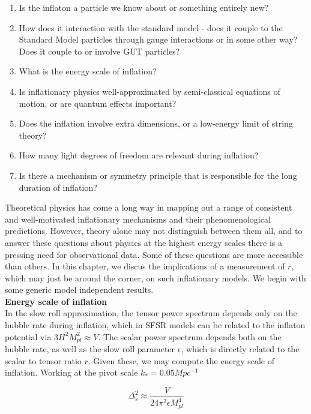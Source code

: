 \documentclass[a4paper,10pt]{article}
\newcommand{\Mp}{M_{pl}}
\begin{document}
\begin{enumerate}
\item Is the inflaton a particle we know about or something entirely new? 
\item How does it interaction with the standard model - does it couple to the Standard Model particles through gauge interactions or in some other way? Does it couple to or involve GUT particles?
\item What is the energy scale of inflation?
\item Is inflationary physics well-approximated by semi-classical equations of motion, or are quantum effects important? 
\item Does the inflation involve extra dimensions, or a low-energy limit of string theory? 
\item How many light degrees of freedom are relevant during inflation? 
\item Is there a mechanism or symmetry principle that is responsible for the long duration of inflation?
\end{enumerate}

Theoretical physics has come a long way in mapping out a range of consistent and well-motivated inflationary mechanisms and their phenomenological predictions. However, theory alone may not distinguish between them all, and to answer these questions about physics at the highest energy scales there is a pressing need for observational data. Some of these questions are more accessible than others. In this chapter, we discus the implications of a measurement of $r$, which may just be around the corner, on such inflationary models. We begin with some generic model independent results.\\

\textbf{Energy scale of inflation} \\

In the slow roll approximation, the tensor power spectrum depends only on the hubble rate during inflation, which in SFSR models can be related to the inflaton potential via $3H^2\Mp^2\approx V$. The scalar power spectrum depends both on the hubble rate, as well as the slow roll parameter $\epsilon$, which is directly related to the scalar to tensor ratio $r$. Given these, we may compute the energy scale of inflation. Working at the pivot scale $k_* = 0.05Mpc^{-1}$

\begin{equation}
\Delta^2_{s}\approx \frac{V}{24\pi^2\epsilon\Mp^4}
\end{equation}
\end{document}

